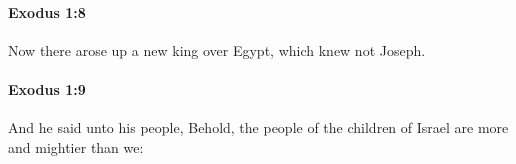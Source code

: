 		\paragraph{Exodus 1:8} %
			\label{EXODUS-1-8}

			Now there arose up a new king over Egypt, which knew not Joseph.


		\paragraph{Exodus 1:9} %
			\label{EXODUS-1-9}

			And he said unto his people, Behold, the people of the children of Israel are more and mightier than we:


